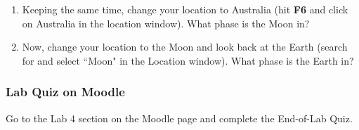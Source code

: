 \documentclass[main.tex]{subfiles}
\begin{document}
\begin{enumerate}
\item Keeping the same time, change your location to Australia (hit \textbf{F6} and click on Australia in the location window). What phase is the Moon in?

\item Now, change your location to the Moon and look back at the Earth (search for and select ``Moon" in the Location window). What phase is the Earth in?

\end{enumerate}

\subsubsection{Lab Quiz on Moodle}
Go to the Lab 4 section on the Moodle page and complete the End-of-Lab Quiz.


\end{document}
